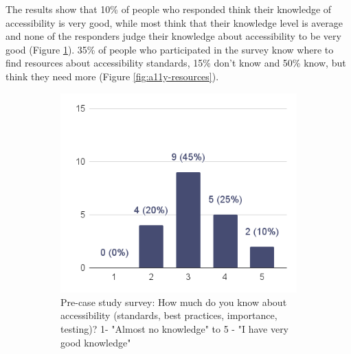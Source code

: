 \documentclass{master_thesis}
\begin{document}
The results show that 10\% of people who responded think their knowledge of accessibility is very good, while most think that their knowledge level is average and none of the responders judge their knowledge about accessibility to be very good (Figure \ref{fig:a11y-knowledge-current}). 35\% of people who participated in the survey know where to find resources about accessibility standards, 15\% don't know and 50\% know, but think they need more (Figure \ref{fig:a11y-resources}).

\begin{figure}[H]
    \centering
	\begin{subfigure}{0.5\textwidth}
		\includegraphics[width=\textwidth]{img/a11y-knowledge.png}
		\caption{Pre-case study survey: How much do you know about accessibility (standards, best practices, importance, testing)? 1- "Almost no knowledge" to 5 - "I have very good knowledge" }
		\label{fig:a11y-knowledge-current}
	\end{subfigure}
	\hspace{0.05\textwidth}
	\begin{subfigure}{0.4\textwidth}

\end{subfigure}
\end{figure}
\end{document}
